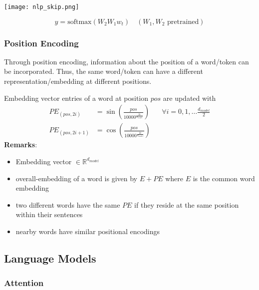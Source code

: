 \begin{center}
    \texttt{[image: nlp\_skip.png]}
\end{center}
\noindent\begin{equation*}
    y = \mathrm{softmax} \left(W_2 W_1 w_t\right) \quad (W_1, W_2 \text{ pretrained})
\end{equation*}

\subsubsection{Position Encoding}
Through position encoding, information about the position of a word/token can be incorporated. Thus, the same word/token can have a different representation/embedding at different positions.
\newpar{}

Embedding vector entries of a word at position $pos$ are updated with
\noindent\begin{align*}
    PE_{(pos,2i)}   & =\sin\left(\frac{pos}{10000^{\frac{2i}{d_{model}}}}\right) &  & \forall i = 0,1, \ldots \frac{d_{model}}{2} \\
    PE_{(pos,2i+1)} & =\cos\left(\frac{pos}{10000^{\frac{2i}{d_{model}}}}\right) &  &
\end{align*}
\textbf{Remarks}:
\begin{itemize}
    \item Embedding vector $\in \mathbb{R}^{d_{model}}$
    \item overall-embedding of a word is given by $E+PE$ where $E$ is the common word embedding
    \item two different words have the same $PE$ if they reside at the same position within their sentences
    \item nearby words have similar positional encodings
\end{itemize}

\subsection{Language Models}
\subsubsection{Attention}


